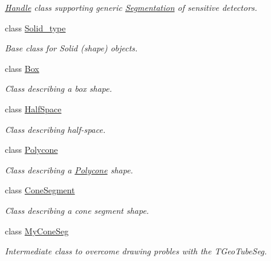 \begin{DoxyCompactItemize}
\begin{DoxyCompactList}\small\item\em \hyperlink{class_d_d4hep_1_1_handle}{Handle} class supporting generic \hyperlink{class_d_d4hep_1_1_geometry_1_1_segmentation}{Segmentation} of sensitive detectors. \item\end{DoxyCompactList}\item 
class \hyperlink{class_d_d4hep_1_1_geometry_1_1_solid__type}{Solid\_\-type}
\begin{DoxyCompactList}\small\item\em Base class for Solid (shape) objects. \item\end{DoxyCompactList}\item 
class \hyperlink{class_d_d4hep_1_1_geometry_1_1_box}{Box}
\begin{DoxyCompactList}\small\item\em Class describing a box shape. \item\end{DoxyCompactList}\item 
class \hyperlink{class_d_d4hep_1_1_geometry_1_1_half_space}{HalfSpace}
\begin{DoxyCompactList}\small\item\em Class describing half-\/space. \item\end{DoxyCompactList}\item 
class \hyperlink{class_d_d4hep_1_1_geometry_1_1_polycone}{Polycone}
\begin{DoxyCompactList}\small\item\em Class describing a \hyperlink{class_d_d4hep_1_1_geometry_1_1_polycone}{Polycone} shape. \item\end{DoxyCompactList}\item 
class \hyperlink{class_d_d4hep_1_1_geometry_1_1_cone_segment}{ConeSegment}
\begin{DoxyCompactList}\small\item\em Class describing a cone segment shape. \item\end{DoxyCompactList}\item 
class \hyperlink{class_d_d4hep_1_1_geometry_1_1_my_cone_seg}{MyConeSeg}
\begin{DoxyCompactList}\small\item\em Intermediate class to overcome drawing probles with the TGeoTubeSeg. \item\end{DoxyCompactList}\item 

\end{DoxyCompactItemize}
